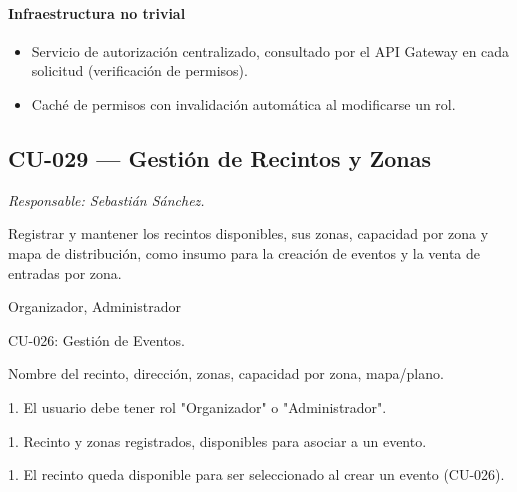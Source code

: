 \paragraph{Infraestructura no trivial}
\begin{itemize}[leftmargin=1.4em, topsep=1pt]
  \item Servicio de autorización centralizado, consultado por el API Gateway en cada solicitud (verificación de permisos).
  \item Caché de permisos con invalidación automática al modificarse un rol.
\end{itemize}

\subsection{CU-029 --- Gestión de Recintos y Zonas}
\label{cu:cu-029}
\textit{Responsable: Sebastián Sánchez.}

\begin{description}[leftmargin=!, labelwidth=3.4cm, style=nextline, topsep=3pt]
\item[Objetivo] Registrar y mantener los recintos disponibles, sus zonas, capacidad por zona y mapa de distribución, como insumo para la creación de eventos y la venta de entradas por zona.

\item[Actores] Organizador, Administrador

\item[CU relacionados] CU-026: Gestión de Eventos.

\item[Entradas] Nombre del recinto, dirección, zonas, capacidad por zona, mapa/plano.

\item[Pre-condiciones] 1. El usuario debe tener rol "Organizador" o "Administrador".

\item[Salidas] 1. Recinto y zonas registrados, disponibles para asociar a un evento.

\item[Post-condiciones] 1. El recinto queda disponible para ser seleccionado al crear un evento (CU-026).

\end{description}

